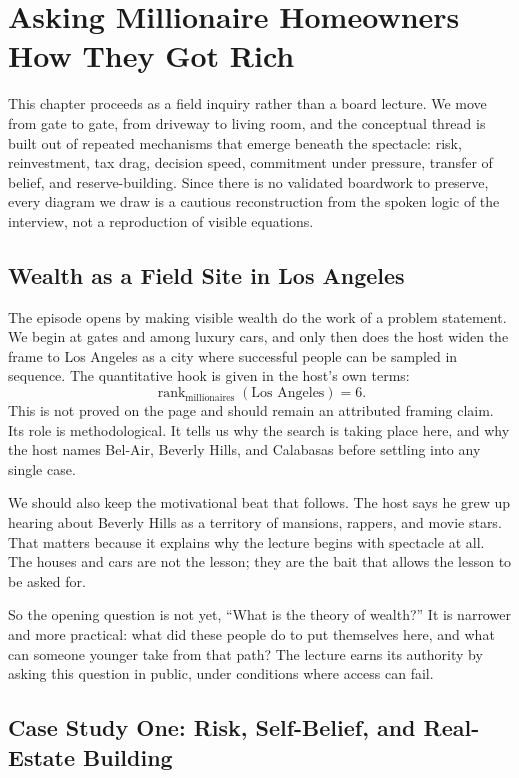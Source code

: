 \chapter{Asking Millionaire Homeowners How They Got Rich}

This chapter proceeds as a field inquiry rather than a board lecture. We move from gate to gate, from driveway to living room, and the conceptual thread is built out of repeated mechanisms that emerge beneath the spectacle: risk, reinvestment, tax drag, decision speed, commitment under pressure, transfer of belief, and reserve-building. Since there is no validated boardwork to preserve, every diagram we draw is a cautious reconstruction from the spoken logic of the interview, not a reproduction of visible equations.

\section{Wealth as a Field Site in Los Angeles}

The episode opens by making visible wealth do the work of a problem statement. We begin at gates and among luxury cars, and only then does the host widen the frame to Los Angeles as a city where successful people can be sampled in sequence. The quantitative hook is given in the host's own terms:
\begin{equation}
\operatorname{rank}_{\text{millionaires}}(\text{Los Angeles}) = 6.
\end{equation}
This is not proved on the page and should remain an attributed framing claim. Its role is methodological. It tells us why the search is taking place here, and why the host names Bel-Air, Beverly Hills, and Calabasas before settling into any single case.

We should also keep the motivational beat that follows. The host says he grew up hearing about Beverly Hills as a territory of mansions, rappers, and movie stars. That matters because it explains why the lecture begins with spectacle at all. The houses and cars are not the lesson; they are the bait that allows the lesson to be asked for.

So the opening question is not yet, ``What is the theory of wealth?'' It is narrower and more practical: what did these people do to put themselves here, and what can someone younger take from that path? The lecture earns its authority by asking this question in public, under conditions where access can fail.

\section{Case Study One: Risk, Self-Belief, and Real-Estate Building}

